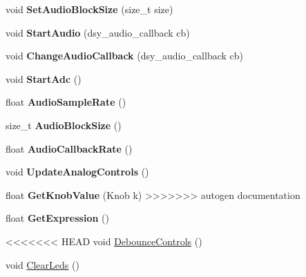 \begin{DoxyCompactItemize}
\begin{DoxyCompactItemize}
void {\bfseries Set\+Audio\+Block\+Size} (size\+\_\+t size)
\item 
\mbox{\label{classdaisy_1_1_daisy_petal_a572c76020919f6363464f72866f3b973}} 
void {\bfseries Start\+Audio} (dsy\+\_\+audio\+\_\+callback cb)
\item 
\mbox{\label{classdaisy_1_1_daisy_petal_acd4dbd545c4d5f42bdb169ba1753bc1b}} 
void {\bfseries Change\+Audio\+Callback} (dsy\+\_\+audio\+\_\+callback cb)
\item 
\mbox{\label{classdaisy_1_1_daisy_petal_aa7b47fd816c66ad98b59c2c36e5ea825}} 
void {\bfseries Start\+Adc} ()
\item 
\mbox{\label{classdaisy_1_1_daisy_petal_a0dd4cd258b93361e79408447874e7a4b}} 
float {\bfseries Audio\+Sample\+Rate} ()
\item 
\mbox{\label{classdaisy_1_1_daisy_petal_aaacb3002e690c01da9c63acf741121c8}} 
size\+\_\+t {\bfseries Audio\+Block\+Size} ()
\item 
\mbox{\label{classdaisy_1_1_daisy_petal_a1dc67ed122d10676ac2792e01327269e}} 
float {\bfseries Audio\+Callback\+Rate} ()
\item 
\mbox{\label{classdaisy_1_1_daisy_petal_a7a8efb2430f286292e75303cedaf0dcb}} 
void {\bfseries Update\+Analog\+Controls} ()
\item 
\mbox{\label{classdaisy_1_1_daisy_petal_ae07c2c28f621f2cd0bb957f84f884e67}} 
float {\bfseries Get\+Knob\+Value} (Knob k)
>>>>>>> autogen documentation
\item 
\mbox{\label{classdaisy_1_1_daisy_petal_a603974a7c50f2761b83b557504f4fe18}} 
float {\bfseries Get\+Expression} ()
\item 
<<<<<<< HEAD
void \hyperlink{classdaisy_1_1_daisy_petal_abb215401101f03ccfbc07736b11c5dbc}{Debounce\+Controls} ()
\item 
void \hyperlink{classdaisy_1_1_daisy_petal_a8588251c1467e19448ee5c6d9cd8d721}{Clear\+Leds} ()

\end{DoxyCompactItemize}
\end{DoxyCompactItemize}
